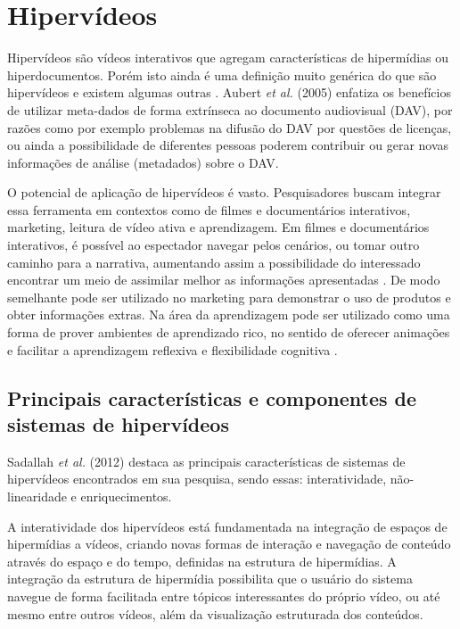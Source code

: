 \section{Hipervídeos}

Hipervídeos são vídeos interativos que agregam características de hipermídias ou hiperdocumentos. Porém isto ainda é uma definição muito genérica do que são hipervídeos e existem algumas outras \cite{chambel2004}. Aubert \textit{et al.} (2005) enfatiza os benefícios de utilizar meta-dados de forma extrínseca ao documento audiovisual (DAV), por razões como por exemplo problemas na difusão do DAV por questões de licenças, ou ainda a possibilidade de diferentes pessoas poderem contribuir ou gerar novas informações de análise (metadados) sobre o DAV.

O potencial de aplicação de hipervídeos é vasto. Pesquisadores buscam integrar essa ferramenta em contextos como de filmes e documentários interativos, marketing, leitura de vídeo ativa e aprendizagem. Em filmes e documentários interativos, é possível ao espectador navegar pelos cenários, ou tomar outro caminho para a narrativa, aumentando assim a possibilidade do interessado encontrar um meio de assimilar melhor as informações apresentadas \cite{mozilla2012, sawhney1996, lippman1980, shipman2003}. De modo semelhante pode ser utilizado no marketing para demonstrar o uso de produtos e obter informações extras. Na área da aprendizagem pode ser utilizado como uma forma de prover ambientes de aprendizado rico, no sentido de oferecer animações e facilitar a aprendizagem reflexiva e flexibilidade cognitiva \cite{zhan2004, shipman2003}.

\subsection{Principais características e componentes de sistemas de hipervídeos}

Sadallah \textit{et al.} (2012) destaca as principais características de sistemas de hipervídeos encontrados em sua pesquisa, sendo essas: interatividade, não-linearidade e enriquecimentos.

A interatividade dos hipervídeos está fundamentada na integração de espaços de hipermídias a vídeos, criando novas formas de interação e navegação de conteúdo através do espaço e do tempo, definidas na estrutura de hipermídias. A integração da estrutura de hipermídia possibilita que o usuário do sistema navegue de forma facilitada entre tópicos interessantes do próprio vídeo, ou até mesmo entre outros vídeos, além da visualização estruturada dos conteúdos.


